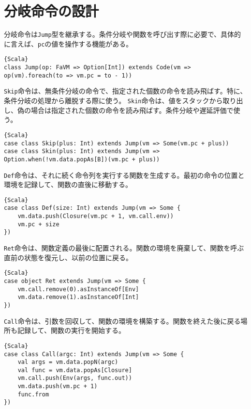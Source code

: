 \documentclass[10pt,a4paper]{book}
\begin{document}
\section{分岐命令の設計\label{sect:jump}}

分岐命令は\texttt{Jump}型を継承する。条件分岐や関数を呼び出す際に必要で、具体的に言えば、\texttt{pc}の値を操作する機能がある。

\begin{Verbatim}{Scala}
class Jump(op: FaVM => Option[Int]) extends Code(vm => op(vm).foreach(to => vm.pc = to - 1))
\end{Verbatim}

\texttt{Skip}命令は、無条件分岐の命令で、指定された個数の命令を読み飛ばす。特に、条件分岐の処理から離脱する際に使う。
\texttt{Skin}命令は、値をスタックから取り出し、偽の場合は指定された個数の命令を読み飛ばす。条件分岐や遅延評価で使う。

\begin{Verbatim}{Scala}
case class Skip(plus: Int) extends Jump(vm => Some(vm.pc + plus))
case class Skin(plus: Int) extends Jump(vm => Option.when(!vm.data.popAs[B])(vm.pc + plus))
\end{Verbatim}

\texttt{Def}命令は、それに続く命令列を実行する関数を生成する。最初の命令の位置と環境を記録して、関数の直後に移動する。

\begin{Verbatim}{Scala}
case class Def(size: Int) extends Jump(vm => Some {
	vm.data.push(Closure(vm.pc + 1, vm.call.env))
	vm.pc + size
})
\end{Verbatim}

\texttt{Ret}命令は、関数定義の最後に配置される。関数の環境を廃棄して、関数を呼ぶ直前の状態を復元し、以前の位置に戻る。

\begin{Verbatim}{Scala}
case object Ret extends Jump(vm => Some {
	vm.call.remove(0).asInstanceOf[Env]
	vm.data.remove(1).asInstanceOf[Int]
})
\end{Verbatim}

\texttt{Call}命令は、引数を回収して、関数の環境を構築する。関数を終えた後に戻る場所も記録して、関数の実行を開始する。

\begin{Verbatim}{Scala}
case class Call(argc: Int) extends Jump(vm => Some {
	val args = vm.data.popN(argc)
	val func = vm.data.popAs[Closure]
	vm.call.push(Env(args, func.out))
	vm.data.push(vm.pc + 1)
	func.from
})
\end{Verbatim}
\end{document}
